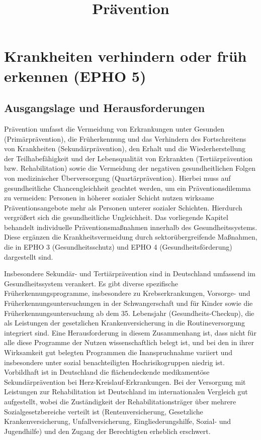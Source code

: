 \documentclass{article}
\begin{document}
\title{Prävention}

\maketitle


\section{Krankheiten verhindern oder früh erkennen (EPHO 5)}\label{H7379212}



\subsection{Ausgangslage und Herausforderungen}\label{H7072444}



Prävention umfasst die Vermeidung von Erkrankungen unter Gesunden (Primärprävention), die Früherkennung und das Verhindern des Fortschreitens von Krankheiten (Sekundärprävention), den Erhalt und die Wiederherstellung der Teilhabefähigkeit und der Lebensqualität von Erkrankten (Tertiärprävention bzw. Rehabilitation) sowie die Vermeidung der negativen gesundheitlichen Folgen von medizinischer Überversorgung (Quartärprävention). Hierbei muss auf gesundheitliche Chancengleichheit geachtet werden, um ein Präventionsdilemma zu vermeiden: Personen in höherer sozialer Schicht nutzen wirksame Präventionsangebote mehr als Personen unterer sozialer Schichten. Hierdurch vergrößert sich die gesundheitliche Ungleichheit. Das vorliegende Kapitel behandelt individuelle Präventionsmaßnahmen innerhalb des Gesundheitssystems. Diese ergänzen die Krankheitsvermeidung durch sektorübergreifende Maßnahmen, die in EPHO 3 (Gesundheitsschutz) und EPHO 4 (Gesundheitsförderung) dargestellt sind.


Insbesondere Sekundär- und Tertiärprävention sind in Deutschland umfassend im Gesundheitssystem verankert. Es gibt diverse spezifische Früherkennungsprogramme, insbesondere zu Krebserkrankungen, Vorsorge- und Früherkennungsuntersuchungen in der Schwangerschaft und für Kinder sowie die Früherkennungsuntersuchung ab dem 35. Lebensjahr (Gesundheits-Checkup), die als Leistungen der gesetzlichen Krankenversicherung in die Routineversorgung integriert sind. Eine Herausforderung in diesem Zusammenhang ist, dass nicht für alle diese Programme der Nutzen wissenschaftlich belegt ist, und bei den in ihrer Wirksamkeit gut belegten Programmen die Inanspruchnahme variiert und insbesondere unter sozial benachteiligten Hochrisikogruppen niedrig ist. Vorbildhaft ist in Deutschland die flächendeckende medikamentöse Sekundärprävention bei Herz-Kreislauf-Erkrankungen. Bei der Versorgung mit Leistungen zur Rehabilitation ist Deutschland im internationalen Vergleich gut aufgestellt, wobei die Zuständigkeit der Rehabilitationsträger über mehrere Sozialgesetzbereiche verteilt ist (Rentenversicherung, Gesetzliche Krankenversicherung, Unfallversicherung, Eingliederungshilfe, Sozial- und Jugendhilfe) und den Zugang der Berechtigten erheblich erschwert.
\end{document}
